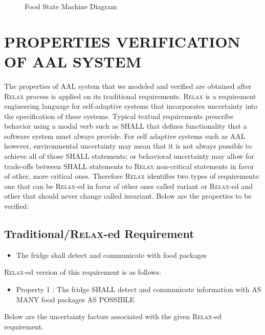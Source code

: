 \documentclass[a4paper,twoside]{article}
\def\myrelax{\textsc{Relax}}                  %
\begin{document}
\begin{figure}[!h]
  \centering
  {}
  \caption{Food State Machine Diagram}
  \label{fig:foodstm}
 \end{figure}

\section{\uppercase{Properties Verification of AAL system}}
\label{sec:properties}
The properties of AAL system that we modeled and verified are obtained after \myrelax{} process is applied on its traditional requirements. \myrelax{}  is  a  requirement  engineering language for self-adaptive systems that incorporates uncertainty into the specification of these systems. Typical  textual  requirements  prescribe behavior  using  a  modal  verb  such  as  SHALL  that defines  functionality  that  a  software  system  must always provide. For self adaptive systems such as AAL however, environmental  uncertainty  may  mean  that  it  is  not always  possible  to  achieve  all  of  those  SHALL statements; or behavioral uncertainty may allow for trade-offs between SHALL statements to \myrelax{} non-critical  statements  in  favor  of  other,  more  critical ones.  Therefore  \myrelax{}  identifies  two  types  of requirements:  one  that  can  be  \myrelax{}-ed  in  favor  of other ones called variant or \myrelax{}-ed and other that should never change called invariant.
Below are the properties to be verified: 

\subsection{Traditional/\myrelax{}-ed Requirement}

\begin{itemize}
\item The fridge shall detect and communicate with food packages
\end{itemize}

\myrelax{}-ed version of this requirement is as follows:

\begin{itemize}
\item Property 1 : The fridge SHALL detect and communicate information with AS MANY food packages AS POSSIBLE
\end{itemize}

Below are the uncertainty factors associated with the given \myrelax{}-ed requirement.
\end{document}
